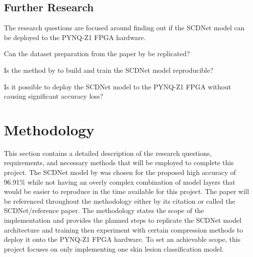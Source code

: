 \documentclass[12pt,nonacm,acmlarge,titlepage,screen]{acmart}
\begin{document}
	\subsection{Further Research}
	

	The research questions are focused around finding out if the SCDNet model can be deployed to the PYNQ-Z1 FPGA hardware.
	\begin{researchqs}
		\item\label{resq:dataset_reproducible} Can the dataset preparation from the paper by \citet{scdnet_2022} be replicated?
		\item\label{resq:model_reproducible} Is the method by \citet{scdnet_2022} to build and train the SCDNet model reproducible?
		\item\label{resq:possible_to_deploy} Is it possible to deploy the SCDNet model to the PYNQ-Z1 FPGA without causing significant accuracy loss?
	\end{researchqs}

\section{Methodology} \label{sec:method}
This section contains a detailed description of the research questions, requirements, and necessary methods that will be employed to complete this project. The SCDNet model by \citet{scdnet_2022} was chosen for the proposed high accuracy of 96.91\% while not having an overly complex combination of model layers that would be easier to reproduce in the time available for this project. The paper will be referenced throughout the methodology either by its citation or called the SCDNet/reference paper. The methodology states the scope of the implementation and provides the planned steps to replicate the SCDNet model architecture and training then experiment with certain compression methods to deploy it onto the PYNQ-Z1 FPGA hardware. To set an achievable scope, this project focuses on only implementing one skin lesion classification model.
\end{document}
